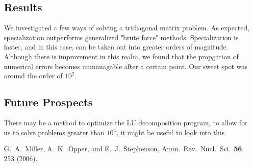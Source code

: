 \documentclass[10pt,showpacs,preprintnumbers,footinbib,amsmath,amssymb,aps,prl,twocolumn,groupedaddress,superscriptaddress,showkeys]{revtex4-1}
\begin{document}
	\subsection{Results}
	We investigated a few ways of solving a tridiagonal matrix problem. As expected, specialization outperforms generalized "brute force" methods. Specialization is faster, and in this case, can be taken out into greater orders of magnitude. Although there is improvement in this realm, we found that the propgation of numerical errors becomes unmanagable after a certain point. Our sweet spot was around the order of $10^{2}$.

	\subsection{Future Prospects}
	There may be a method to optimize the LU decomposition program, to allow for us to solve problems greater than $10^{4}$, it might be useful to look into this. 

\begin{thebibliography}{99}
 G.~A.~Miller, A.~K.~Opper, and E.~J.~Stephenson, Annu.~Rev.~Nucl.~Sci.~{\bf 56}, 253 (2006).
\end{thebibliography}
\end{document}
